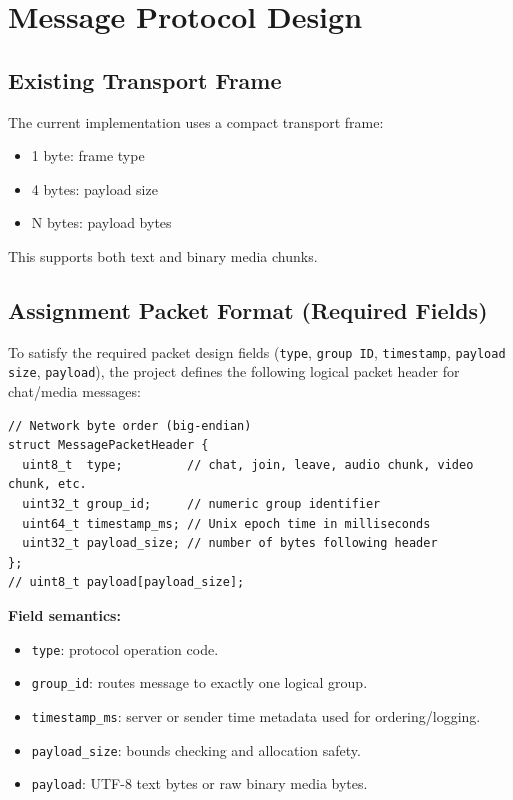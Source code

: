 \documentclass[12pt,letterpaper]{article}
\begin{document}
\section{Message Protocol Design}

\subsection{Existing Transport Frame}

The current implementation uses a compact transport frame:

\begin{itemize}[leftmargin=1.5em]
  \item 1 byte: frame type
  \item 4 bytes: payload size
  \item N bytes: payload bytes
\end{itemize}

This supports both text and binary media chunks.

\subsection{Assignment Packet Format (Required Fields)}

To satisfy the required packet design fields (\texttt{type}, \texttt{group ID},
\texttt{timestamp}, \texttt{payload size}, \texttt{payload}), the project defines
the following logical packet header for chat/media messages:

\begin{lstlisting}[style=cstyle, caption={MessagePacketHeader --- network byte order (big-endian)}]
// Network byte order (big-endian)
struct MessagePacketHeader {
  uint8_t  type;         // chat, join, leave, audio chunk, video chunk, etc.
  uint32_t group_id;     // numeric group identifier
  uint64_t timestamp_ms; // Unix epoch time in milliseconds
  uint32_t payload_size; // number of bytes following header
};
// uint8_t payload[payload_size];
\end{lstlisting}

\medskip
\noindent\textbf{Field semantics:}
\begin{itemize}[leftmargin=1.5em]
  \item \texttt{type}: protocol operation code.
  \item \texttt{group\_id}: routes message to exactly one logical group.
  \item \texttt{timestamp\_ms}: server or sender time metadata used for ordering/logging.
  \item \texttt{payload\_size}: bounds checking and allocation safety.
  \item \texttt{payload}: UTF-8 text bytes or raw binary media bytes.
\end{itemize}
\end{document}
